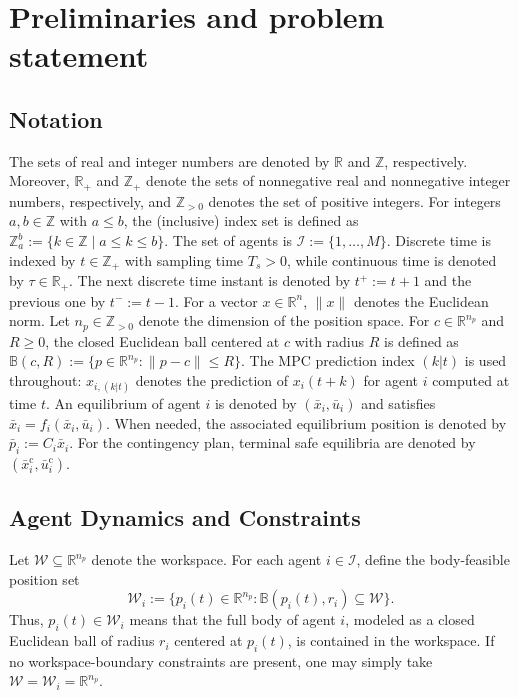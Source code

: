 \documentclass[twocolumn]{autart}
\begin{document}
\section{Preliminaries and problem statement}
\label{sec:prelim}

\subsection{Notation}
\label{subsec:notation}
The sets of real and integer numbers are denoted by $\mathbb{R}$ and $\mathbb{Z}$, respectively. Moreover, $\mathbb{R}_+$ and $\mathbb{Z}_+$ denote the sets of nonnegative real and nonnegative integer numbers, respectively, and $\mathbb{Z}_{>0}$ denotes the set of positive integers. For integers $a,b\in\mathbb{Z}$ with $a\le b$, the (inclusive) index set is defined as
\(
\mathbb{Z}_a^b := \{k\in\mathbb{Z}\mid a \le k \le b\}.
\)
The set of agents is
\(
\mathcal{I} := \{1,\dots,M\}.
\)
Discrete time is indexed by $t\in\mathbb{Z}_+$ with sampling time $T_s>0$, while continuous time is denoted by $\tau\in\mathbb{R}_+$.
The next discrete time instant is denoted by $t^+ := t+1$ and the previous one by $t^- := t-1$.
For a vector $x\in\mathbb{R}^n$, $\|x\|$ denotes the Euclidean norm.
Let $n_p \in \mathbb{Z}_{>0}$ denote the dimension of the position space. For $c\in\mathbb{R}^{n_p}$ and $R\ge 0$, the closed Euclidean ball centered at $c$ with radius $R$ is defined as
\(
\mathbb{B}(c,R) := \{p\in\mathbb{R}^{n_p} : \|p-c\| \le R\}.
\)
The MPC prediction index $(k|t)$ is used throughout: $x_{i,(k|t)}$ denotes the prediction of $x_i(t+k)$ for agent $i$ computed at time $t$.
An equilibrium of agent $i$ is denoted by $(\bar x_i,\bar u_i)$ and satisfies
\(
\bar x_i = f_i(\bar x_i,\bar u_i).
\)
When needed, the associated equilibrium position is denoted by $\bar p_i := C_i \bar x_i$.
For the contingency plan, terminal safe equilibria are denoted by $(\bar x_i^{\mathrm c}, \bar u_i^{\mathrm c})$.

\subsection{Agent Dynamics and Constraints}
\label{subsec:dynamics}
Let \(\mathcal W \subseteq \mathbb{R}^{n_p}\) denote the workspace. For each agent \(i \in \mathcal{I}\), define the
body-feasible position set
\[
\mathcal W_i := \{p_i(t) \in \mathbb{R}^{n_p} : \mathbb{B}(p_i(t),r_i) \subseteq \mathcal W\}.
\]
Thus, \(p_i(t) \in \mathcal W_i\) means that the full body of agent \(i\), modeled as a
closed Euclidean ball of radius \(r_i\) centered at \(p_i(t)\), is contained in the workspace.
If no workspace-boundary constraints are present, one may simply take
\(\mathcal W= \mathcal W_i =\mathbb{R}^{n_p}\).
\end{document}
